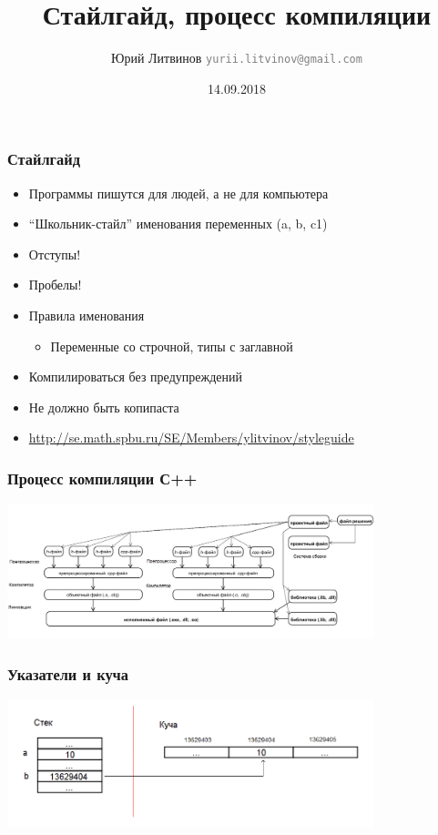 \documentclass[xetex,mathserif,serif]{beamer}
\title{Стайлгайд, процесс компиляции}
\author[Юрий Литвинов]{Юрий Литвинов \newline \textcolor{gray}{\small\texttt{yurii.litvinov@gmail.com}}}
\date{14.09.2018}
\begin{document}
	
	\frame{\titlepage}
	
	\begin{frame}
		\frametitle{Стайлгайд}
		\begin{itemize}
			\item Программы пишутся для людей, а не для компьютера
			\item “Школьник-стайл” именования переменных (a, b, c1)
			\item Отступы!
			\item Пробелы!
			\item Правила именования
			\begin{itemize}
				\item Переменные со строчной, типы с заглавной
			\end{itemize}
			\item Компилироваться без предупреждений
			\item Не должно быть копипаста
			\item \url{http://se.math.spbu.ru/SE/Members/ylitvinov/styleguide}
		\end{itemize}
	\end{frame}

	\begin{frame}
		\frametitle{Процесс компиляции С++}
		\begin{center}
			\includegraphics[width=0.8\textwidth]{compilation.png}
		\end{center}
	\end{frame}

	\begin{frame}
		\frametitle{Указатели и куча}
		\begin{center}
			\includegraphics[width=0.8\textwidth]{pointers.png}
		\end{center}
	\end{frame}
\end{document}
